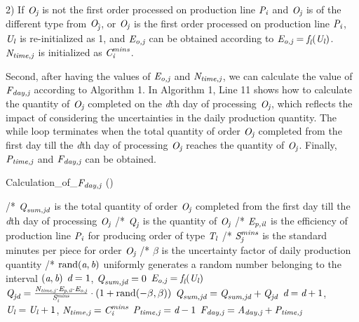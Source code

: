 \documentclass[journal]{IEEEtran}
\theoremstyle{definition}
\begin{document}
2) If $\emph{O}_\emph{j}$ is not the first order processed on production line $\emph{P}_\emph{i}$ and $\emph{O}_\emph{j}$ is of the different type from $\emph{O}_{\hat{\emph{j}}}$, or $\emph{O}_\emph{j}$ is the first order processed on production line $\emph{P}_\emph{i}$, $\emph{U}_\emph{l}$ is re-initialized as 1, and $\emph{E}_\emph{o,j}$ can be obtained according to $\emph{E}_\emph{o,j}=\emph{f}_\emph{l}(\emph{U}_\emph{l})$. $\emph{N}_\emph{time,j}$ is initialized as $\emph{C}^\emph{mins}_\emph{i}$.

Second, after having the values of $\emph{E}_\emph{o,j}$ and $\emph{N}_\emph{time,j}$, we can calculate the value of $\emph{F}_\emph{day,j}$ according to Algorithm 1.
In Algorithm 1, Line 11 shows how to calculate the quantity of $\emph{O}_\emph{j}$ completed on the \emph{d}th day of processing $\emph{O}_\emph{j}$, which reflects the impact of considering the uncertainties in the daily production quantity. The while loop terminates when the total quantity of order $\emph{O}_\emph{j}$ completed from the first day till the \emph{d}th day of processing $\emph{O}_\emph{j}$ reaches the quantity of $\emph{O}_\emph{j}$. Finally, $\emph{P}_\emph{time,j}$ and $\emph{F}_\emph{day,j}$ can be obtained.
\begin{algorithm}[!t]
\scriptsize{
\caption{Calculation\_of\_$\emph{F}_\emph{day,j}$ ()} 
{\begin{algorithmic}[1]
\Begin
\State /* $\emph{Q}_\emph{sum,jd}$ is the total quantity of order $\emph{O}_\emph{j}$ completed from the first day till the \emph{d}th day of processing $\emph{O}_\emph{j}$
\State /* $\emph{Q}_\emph{j}$ is the quantity of $\emph{O}_\emph{j}$
\State /* $\emph{E}_\emph{p,il}$ is the efficiency of production line $\emph{P}_\emph{i}$ for producing order of type $\emph{T}_\emph{l}$
\State /* $\emph{S}^\emph{mins}_\emph{j}$ is the standard minutes per piece for order $\emph{O}_\emph{j}$
\State /* $\beta$ is the uncertainty factor of daily production quantity
\State /* $\textrm{rand}(\emph{a},\emph{b})$ uniformly generates a random number belonging to the interval $(\emph{a},\emph{b})$
\State $\emph{d}=1$, $\emph{Q}_\emph{sum,jd}=0$
\State $\emph{E}_\emph{o,j}=\emph{f}_\emph{l}(\emph{U}_\emph{l})$
\State $\emph{Q}_\emph{jd}=\frac{\emph{N}_\emph{time,j}\cdot\emph{E}_\emph{p,il}\cdot\emph{E}_\emph{o,j}}{\emph{S}^\emph{mins}_\emph{i}}\cdot(1+\textrm{rand}(-\beta,\beta))$
\State $\emph{Q}_\emph{sum,jd}=\emph{Q}_\emph{sum,jd}+\emph{Q}_\emph{jd}$
\State $\emph{d}=\emph{d}+1$, $\emph{U}_\emph{l}=\emph{U}_\emph{l}+1$, $\emph{N}_\emph{time,j}=\emph{C}^\emph{mins}_\emph{i}$
\EndWhile
\State $\emph{P}_\emph{time,j}=\emph{d}-1$
\State $\emph{F}_\emph{day,j}=\emph{A}_\emph{day,j}+\emph{P}_\emph{time,j}$
\End
\end{algorithmic}}}
\end{algorithm}
\end{document}
